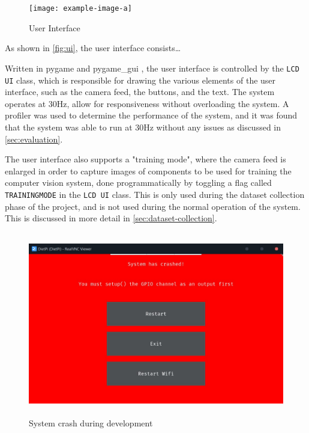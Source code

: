 \begin{figure}[H]
    \hfill
    \begin{minipage}[t]{\textwidth}
      \centering
      \texttt{[image: example-image-a]}
      \caption{User Interface}
      \label{fig:ui}
    \end{minipage}
\end{figure}

As shown in \autoref{fig:ui}, the user interface consists\dots

Written in pygame \cite{pygamedoc} and pygame\_gui \cite{pygamegui}, the user interface is controlled by the \texttt{LCD UI} class, which is responsible for drawing the various elements of the user interface, such as the camera feed, the buttons, and the text. The system operates at 30Hz, allow for responsiveness without overloading the system. A profiler was used to determine the performance of the system, and it was found that the system was able to run at 30Hz without any issues as discussed in \autoref{sec:evaluation}.

The user interface also supports a "training mode", where the camera feed is enlarged in order to capture images of components to be used for training the computer vision system, done programmatically by toggling a flag called \texttt{TRAININGMODE} in the \texttt{LCD UI} class. This is only used during the dataset collection phase of the project, and is not used during the normal operation of the system. This is discussed in more detail in \autoref{sec:dataset-collection}.

\begin{figure}[H]
    \hfill
    \begin{minipage}[t]{\textwidth}
      \centering
      \includegraphics[height=8cm]{imgs/python/systemcrash.jpg}
      \caption{System crash during development}
      \label{fig:crash}
    \end{minipage}
\end{figure}

